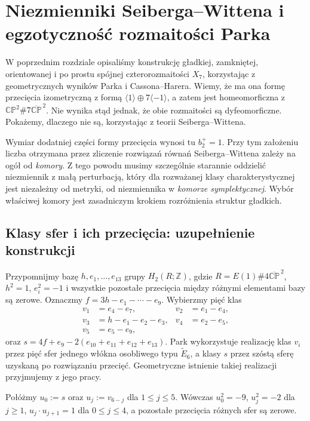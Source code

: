 \chapter{Niezmienniki Seiberga--Wittena i egzotyczność rozmaitości Parka}
\label{ch:tg-park-sw}

W poprzednim rozdziale opisaliśmy konstrukcję gładkiej,
zamkniętej, orientowanej i po prostu spójnej
czterorozmaitości $X_7$, korzystając z geometrycznych
wyników Parka i Cassona--Harera.
Wiemy, że ma ona formę przecięcia izometryczną z formą
$\langle1\rangle\oplus7\langle-1\rangle$, a zatem jest
homeomorficzna z $\mathbb{CP}^2\#7\overline{\mathbb{CP}}^{\,2}$.
Nie wynika stąd jednak, że obie rozmaitości są dyfeomorficzne.
Pokażemy, dlaczego nie są, korzystając z teorii Seiberga--Wittena.

Wymiar dodatniej części formy przecięcia wynosi tu $b_2^+=1$.
Przy tym założeniu liczba otrzymana przez zliczenie rozwiązań
równań Seiberga--Wittena zależy na ogół od \emph{komory}.
Z tego powodu musimy szczególnie starannie oddzielić niezmiennik
z małą perturbacją, który dla rozważanej klasy charakterystycznej
jest niezależny od metryki, od niezmiennika w \emph{komorze
symplektycznej}. Wybór właściwej komory jest zasadniczym krokiem
rozróżnienia struktur gładkich.

\section{Klasy sfer i ich przecięcia: uzupełnienie konstrukcji}
\label{sec:tg-park14-spheres}

Przypomnijmy bazę $h,e_1,\ldots,e_{13}$ grupy
$H_2(R;\mathbb Z)$, gdzie $R=E(1)\#4\overline{\mathbb{CP}}^{\,2}$,
$h^2=1$, $e_i^2=-1$ i wszystkie pozostałe przecięcia między
różnymi elementami bazy są zerowe. Oznaczmy
$f=3h-e_1-\cdots-e_9$. Wybierzmy pięć klas
\[
\begin{aligned}
 v_1&=e_4-e_7, & v_2&=e_1-e_4, \\
 v_3&=h-e_1-e_2-e_3, & v_4&=e_2-e_5, \\
 v_5&=e_5-e_9,
\end{aligned}
\]
oraz $s=4f+e_9-2(e_{10}+e_{11}+e_{12}+e_{13})$.
Park wykorzystuje realizację klas $v_i$ przez pięć sfer
jednego włókna osobliwego typu $\widetilde E_6$, a klasy $s$
przez szóstą sferę uzyskaną po rozwiązaniu przecięć.
Geometryczne istnienie takiej realizacji przyjmujemy z jego pracy.

\begin{stwierdzenie}
\label{prop:tg-park14-classes}
Połóżmy $u_0:=s$ oraz $u_j:=v_{6-j}$ dla $1\le j\le5$.
Wówczas $u_0^2=-9$, $u_j^2=-2$ dla $j\ge1$,
$u_j\cdot u_{j+1}=1$ dla $0\le j\le4$, a pozostałe
przecięcia różnych sfer są zerowe.
\end{stwierdzenie}

